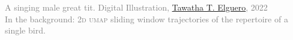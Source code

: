 \documentclass[9pt, twocolumn, twoside]{nilosthesis}
\begin{document}
    \vspace{.5cm}

\begin{multicols}{2} %
    
    \end{multicols} %
    \onecolumn




\thispagestyle{empty}
\onecolumn 
\normalsize
 \vspace*{5cm} %
\begin{center}
\end{center}
    \vspace*{\fill}
\begin{center}
        \textcolor{gray}{A singing male great tit. Digital Illustration, \href{https://www.instagram.com/tawatha.blog}{Tawatha T. Elguero}, 2022\\In the background: \textsc{2d umap} sliding window trajectories of the repertoire of a single bird.}
\end{center}
\afterpage{\restorepagecolor}


\onecolumn %
\end{document}
